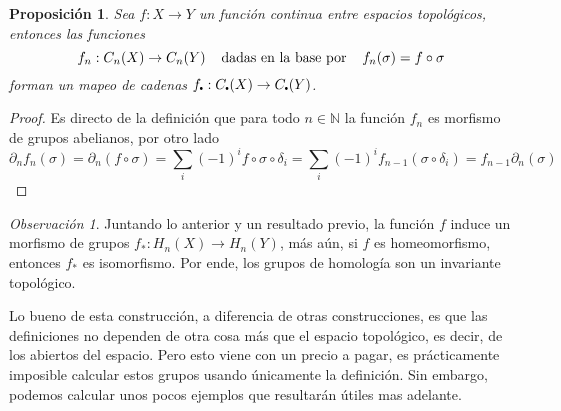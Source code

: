 \documentclass[aop]{imsart2}
\theoremstyle{plain}
\newtheorem{prop}[teo]{Proposición}
\theoremstyle{remark}
\newtheorem*{obs}{Observación}
\newcommand{\hhtext}[1]{\hspace{4mm}\text{#1}\hspace{4mm}}
\newcommand\sbullet[1][.5]{\mathbin{\vcenter{\hbox{\scalebox{#1}{$\bullet$}}}}}
\def \N {\mathbb{N}}
\begin{document}
\begin{prop}
    Sea $f:X\to Y$ un función continua entre espacios topológicos, entonces las funciones
    \begin{equation*}
        f_{n}:C_{n}(X)\to C_{n}(Y)\hhtext{dadas en la base por}f_{n}(\sigma)=f\circ\sigma
    \end{equation*}
    forman un mapeo de cadenas $f_{\sbullet}:C_{\sbullet}(X)\to C_{\sbullet}(Y)$.
\end{prop}

\begin{proof}
    Es directo de la definición que para todo $n\in\N$ la función $f_{n}$ es morfismo de grupos 
    abelianos, por otro lado
    \begin{equation*}
        \partial_{n} f_{n}(\sigma)=\partial_{n}(f\circ\sigma)
        =\sum_{i}(-1)^{i}f\circ\sigma\circ\delta_{i}
        =\sum_{i}(-1)^{i}f_{n-1}(\sigma\circ\delta_{i})=f_{n-1}\partial_{n}(\sigma)
    \end{equation*}
\end{proof}

\begin{obs}
    Juntando lo anterior y un resultado previo, la función $f$ induce un morfismo de grupos
    $f_{*}:H_{n}(X)\to H_{n}(Y)$, más aún, si $f$ es homeomorfismo, entonces $f_{*}$ es 
    isomorfismo. Por ende, los grupos de homología son un invariante topológico.
\end{obs}

\noindent Lo bueno de esta construcción, a diferencia de otras construcciones, es que las 
definiciones no dependen de otra cosa más que el espacio topológico, es decir, de los abiertos del 
espacio. Pero esto viene con un precio a pagar, es prácticamente imposible calcular estos grupos 
usando únicamente la definición. Sin embargo, podemos calcular unos pocos ejemplos que resultarán 
útiles mas adelante.
\end{document}
